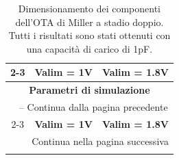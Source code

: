 \begin{longtable}{c|c|c|}
    \caption{Dimensionamento dei componenti dell'OTA di Miller a stadio doppio. Tutti i risultati sono stati ottenuti con una capacità di carico di 1pF.}
    \label{tab:component_sizing_miller_double_stage} \\
    
    \cline{2-3}
    & \textbf{Valim = 1V} & \textbf{Valim = 1.8V} \\ \hline
    \multicolumn{3}{|c|}{\textbf{Parametri di simulazione}} \\ \hline
    \endfirsthead
    
    \multicolumn{3}{c}{\tablename\ \thetable{} -- Continua dalla pagina precedente} \\
    \cline{2-3}
    & \textbf{Valim = 1V} & \textbf{Valim = 1.8V} \\ \hline
    \endhead
    
    \multicolumn{3}{r}{{Continua nella pagina successiva}} \\
    \endfoot
    
    \endlastfoot


\end{longtable}
